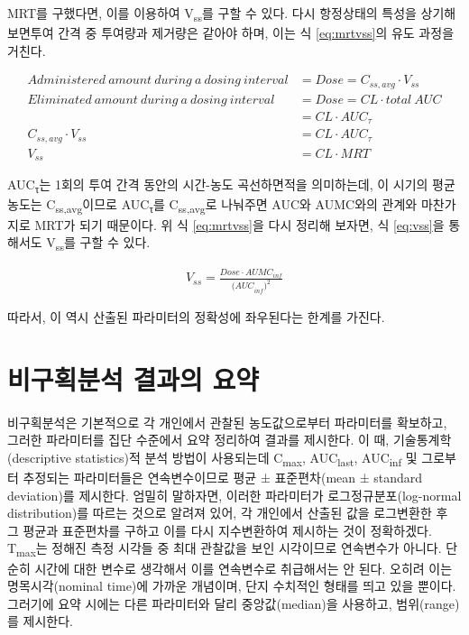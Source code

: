 \documentclass[
  11pt,
  krantz2, a4paper, twoside]{krantz}
\theoremstyle{definition}
\theoremstyle{definition}
\theoremstyle{definition}
\theoremstyle{definition}
\theoremstyle{remark}
\begin{document}
MRT를 구했다면, 이를 이용하여 V\textsubscript{ss}를 구할 수 있다. 다시 항정상태의 특성을 상기해 보면투여 간격 중 투여량과 제거량은 같아야 하며, 이는 식 \eqref{eq:mrtvss}의 유도 과정을 거친다.

\small

\begin{equation}
\begin{split}
  Administered\ amount\ during\ a\ dosing\ interval &= Dose = C_{ss,avg} \cdot V_{{ss}} \\
  Eliminated\ amount\ during\ a\ dosing\ interval &= Dose = CL \cdot total\ AUC \\
  \ \  &= CL \cdot AUC_{\tau} \\
  C_{ss,avg} \cdot V_{{ss}} &= CL \cdot AUC_{\tau} \\
  V_{{ss}} &= CL \cdot MRT
\end{split}
\label{eq:mrtvss}
\end{equation}

\normalsize

AUC\textsubscript{τ}는 1회의 투여 간격 동안의 시간-농도 곡선하면적을 의미하는데, 이 시기의 평균 농도는 C\textsubscript{ss,avg}이므로 AUC\textsubscript{τ}를 C\textsubscript{ss,avg}로 나눠주면 AUC와 AUMC와의 관계와 마찬가지로 MRT가 되기 때문이다.
위 식 \eqref{eq:mrtvss}을 다시 정리해 보자면, 식 \eqref{eq:vss}을 통해서도 V\textsubscript{ss}를 구할 수 있다.

\begin{equation}
\begin{split}
  V_{ss} = \frac{Dose \cdot AUMC_{inf}}{{{(AUC}_{inf})}^2}
\end{split}
\label{eq:vss}
\end{equation}

따라서, 이 역시 산출된 파라미터의 정확성에 좌우된다는 한계를 가진다.

\hypertarget{uxbe44uxad6cuxd68duxbd84uxc11d-uxacb0uxacfcuxc758-uxc694uxc57d}{%
\section{비구획분석 결과의 요약}\label{uxbe44uxad6cuxd68duxbd84uxc11d-uxacb0uxacfcuxc758-uxc694uxc57d}}

비구획분석은 기본적으로 각 개인에서 관찰된 농도값으로부터 파라미터를 확보하고, 그러한 파라미터를 집단 수준에서 요약 정리하여 결과를 제시한다.
이 때, 기술통계학(descriptive statistics)적 분석 방법이 사용되는데 C\textsubscript{max}, AUC\textsubscript{last}, AUC\textsubscript{inf} 및 그로부터 추정되는 파라미터들은 연속변수이므로 평균 ± 표준편차(mean ± standard deviation)를 제시한다.
엄밀히 말하자면, 이러한 파라미터가 로그정규분포(log-normal distribution)를 따르는 것으로 알려져 있어, 각 개인에서 산출된 값을 로그변환한 후 그 평균과 표준편차를 구하고 이를 다시 지수변환하여 제시하는 것이 정확하겠다.
T\textsubscript{max}는 정해진 측정 시각들 중 최대 관찰값을 보인 시각이므로 연속변수가 아니다.
단순히 시간에 대한 변수로 생각해서 이를 연속변수로 취급해서는 안 된다.
오히려 이는 명목시각(nominal time)에 가까운 개념이며, 단지 수치적인 형태를 띄고 있을 뿐이다.
그러기에 요약 시에는 다른 파라미터와 달리 중앙값(median)을 사용하고, 범위(range)를 제시한다.
\end{document}

